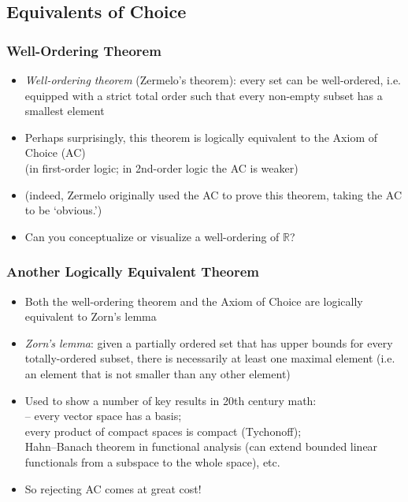 \subsection{Equivalents of Choice}

\begin{frame}
\frametitle{Well-Ordering Theorem}

\begin{itemize}[<+->]

\item \emph{Well-ordering theorem} (Zermelo's theorem): every set can be well-ordered, i.e. equipped with a strict total order such that every non-empty subset has a smallest element

\item Perhaps surprisingly, this theorem is logically equivalent to the Axiom of Choice (AC) \\ (in first-order logic; in 2nd-order logic the AC is weaker)
\item[] (indeed, Zermelo originally used the AC to prove this theorem, taking the AC to be `obvious.')

\item Can you conceptualize or visualize a well-ordering of $\mathbb{R}$? 

\end{itemize}
\end{frame}

\begin{frame}
\frametitle{Another Logically Equivalent Theorem}

\begin{itemize}[<+->]

\item Both the well-ordering theorem and the Axiom of Choice are logically equivalent to Zorn's lemma

\item \emph{Zorn's lemma}: given a partially ordered set that has upper bounds for every totally-ordered subset, there is necessarily at least one maximal element (i.e. an element that is not smaller than any other element)

\item Used to show a number of key results in 20th century math: \\ -- every vector space has a basis; \\  every product of compact spaces is compact (Tychonoff); \\ Hahn--Banach theorem in functional analysis (can extend bounded linear functionals from a subspace to the whole space), etc. 

\item So rejecting AC comes at great cost! 


\end{itemize}
\end{frame}

